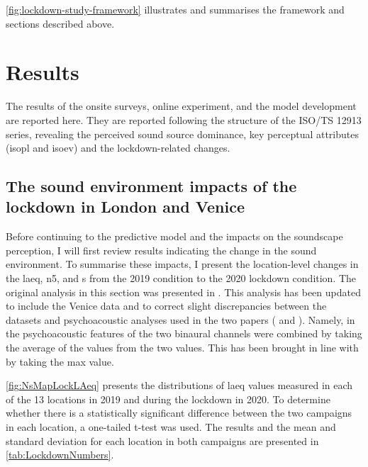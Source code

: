    \cref{fig:lockdown-study-framework} illustrates and summarises the framework and sections described above.

\section{Results}

 The results of the onsite surveys, online experiment, and the model development are reported here. They are reported following the structure of the ISO/TS 12913 series, revealing the perceived sound source dominance, key perceptual attributes (\gls{isopl} and \gls{isoev}) and the lockdown-related changes.

\subsection{The sound environment impacts of the lockdown in London and Venice}
\label{sec:LondonLockdown}

Before continuing to the predictive model and the impacts on the soundscape perception, I will first review results indicating the change in the sound environment. To summarise these impacts, I present the location-level changes in the \gls{laeq}, \gls{n5}, and \gls{s} from the 2019 condition to the 2020 lockdown condition. The original analysis in this section was presented in \citet{Aletta2020Assessing}. This analysis has been updated to include the Venice data and to correct slight discrepancies between the datasets and psychoacoustic analyses used in the two papers (\citet{Aletta2020Assessing} and \citet{Mitchell2021Investigating}). Namely, in \citet{Aletta2020Assessing} the psychoacoustic features of the two binaural channels were combined by taking the average of the values from the two values. This has been brought in line with \citet{Mitchell2021Investigating} by taking the max value.

\cref{fig:NsMapLockLAeq} presents the distributions of \gls{laeq} values measured in each of the 13 locations in 2019 and during the lockdown in 2020. To determine whether there is a statistically significant difference between the two campaigns in each location, a one-tailed t-test was used. The results and the mean and standard deviation for each location in both campaigns are presented in \cref{tab:LockdownNumbers}. 


